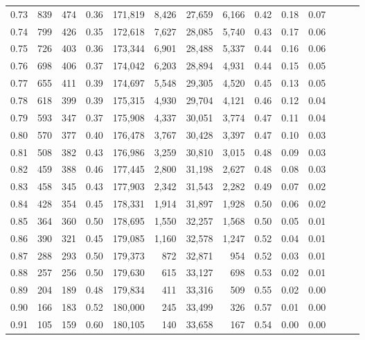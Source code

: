 \begin{tabular}{rrrrrrrrrrrrrr}
0.73 &    839 &  474 &  0.36 &  171,819 &    8,426 &  27,659 &   6,166 &  0.42 &  0.18 &      0.07 \\
0.74 &    799 &  426 &  0.35 &  172,618 &    7,627 &  28,085 &   5,740 &  0.43 &  0.17 &      0.06 \\
0.75 &    726 &  403 &  0.36 &  173,344 &    6,901 &  28,488 &   5,337 &  0.44 &  0.16 &      0.06 \\
0.76 &    698 &  406 &  0.37 &  174,042 &    6,203 &  28,894 &   4,931 &  0.44 &  0.15 &      0.05 \\
0.77 &    655 &  411 &  0.39 &  174,697 &    5,548 &  29,305 &   4,520 &  0.45 &  0.13 &      0.05 \\
0.78 &    618 &  399 &  0.39 &  175,315 &    4,930 &  29,704 &   4,121 &  0.46 &  0.12 &      0.04 \\
0.79 &    593 &  347 &  0.37 &  175,908 &    4,337 &  30,051 &   3,774 &  0.47 &  0.11 &      0.04 \\
0.80 &    570 &  377 &  0.40 &  176,478 &    3,767 &  30,428 &   3,397 &  0.47 &  0.10 &      0.03 \\
0.81 &    508 &  382 &  0.43 &  176,986 &    3,259 &  30,810 &   3,015 &  0.48 &  0.09 &      0.03 \\
0.82 &    459 &  388 &  0.46 &  177,445 &    2,800 &  31,198 &   2,627 &  0.48 &  0.08 &      0.03 \\
0.83 &    458 &  345 &  0.43 &  177,903 &    2,342 &  31,543 &   2,282 &  0.49 &  0.07 &      0.02 \\
0.84 &    428 &  354 &  0.45 &  178,331 &    1,914 &  31,897 &   1,928 &  0.50 &  0.06 &      0.02 \\
0.85 &    364 &  360 &  0.50 &  178,695 &    1,550 &  32,257 &   1,568 &  0.50 &  0.05 &      0.01 \\
0.86 &    390 &  321 &  0.45 &  179,085 &    1,160 &  32,578 &   1,247 &  0.52 &  0.04 &      0.01 \\
0.87 &    288 &  293 &  0.50 &  179,373 &      872 &  32,871 &     954 &  0.52 &  0.03 &      0.01 \\
0.88 &    257 &  256 &  0.50 &  179,630 &      615 &  33,127 &     698 &  0.53 &  0.02 &      0.01 \\
0.89 &    204 &  189 &  0.48 &  179,834 &      411 &  33,316 &     509 &  0.55 &  0.02 &      0.00 \\
0.90 &    166 &  183 &  0.52 &  180,000 &      245 &  33,499 &     326 &  0.57 &  0.01 &      0.00 \\
0.91 &    105 &  159 &  0.60 &  180,105 &      140 &  33,658 &     167 &  0.54 &  0.00 &      0.00 \\

\end{tabular}
